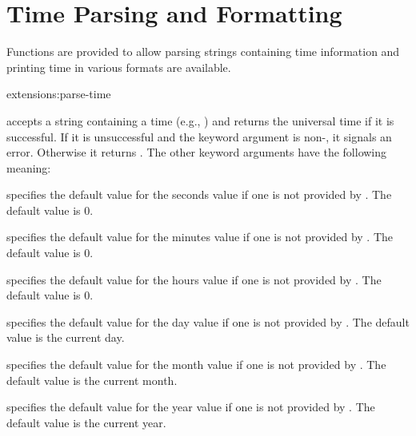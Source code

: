 \section{Time Parsing and Formatting}

 
Functions are provided to allow parsing strings containing time information
and printing time in various formats are available.

\begin{defun}{extensions:}{parse-time}{%
    }
  
   accepts a string containing a time (e.g.,
  ) and returns the universal time if it is
  successful.  If it is unsuccessful and the keyword argument
   is non-\nil{}, it signals an error.
  Otherwise it returns \nil{}.  The other keyword arguments have the
  following meaning:

  \begin{Lentry}
  \item[\kwd{default-seconds}] specifies the default value for the
    seconds value if one is not provided by .  The
    default value is 0.
    
  \item[\kwd{default-minutes}] specifies the default value for the
    minutes value if one is not provided by .  The
    default value is 0.
    
  \item[\kwd{default-hours}] specifies the default value for the hours
    value if one is not provided by .  The default
    value is 0.
    
  \item[\kwd{default-day}] specifies the default value for the day
    value if one is not provided by .  The default
    value is the current day.
    
  \item[\kwd{default-month}] specifies the default value for the month
    value if one is not provided by .  The default
    value is the current month.
    
  \item[\kwd{default-year}] specifies the default value for the year
    value if one is not provided by .  The default
    value is the current year.
    

\end{Lentry}
\end{defun}
